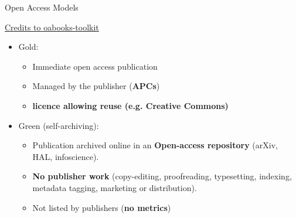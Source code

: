\documentclass[10pt,compress,serif,aspectratio=169]{beamer}
\begin{document}
\begin{frame}[t]{Open Access Models}

\href{ https://oabooks-toolkit.org/lifecycle/article/13868103-green-gold-diamond-different-models-for-open-access-books}{Credits to oabooks-toolkit}
  \vfill

 
 \begin{itemize}
 \item Gold:
   \begin{itemize}
   \item Immediate open access publication
   \item Managed by the publisher (\textbf{APCs})
   \item \textbf{licence allowing reuse (e.g. Creative Commons)}
   \end{itemize}
   \pause
 \item Green (self-archiving):
   \begin{itemize}
   \item Publication archived online in an \textbf{Open-access repository} (arXiv, HAL, infoscience).
   \item \textbf{No publisher work} (copy-editing, proofreading, typesetting, indexing, metadata tagging, marketing or distribution).
   \item Not listed by publishers (\textbf{no metrics})
   \end{itemize}


 \end{itemize}

\end{frame} 
\end{document}
